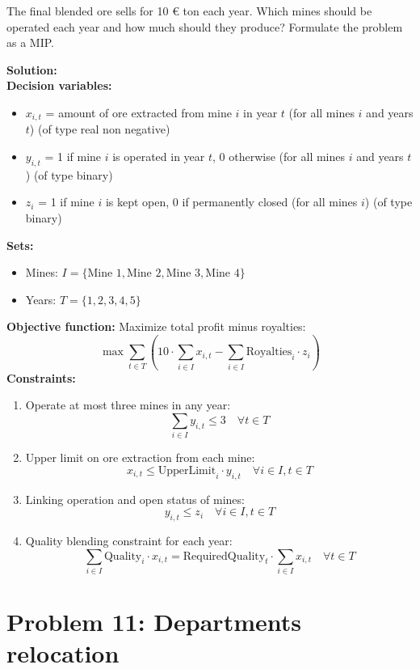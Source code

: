 \documentclass[a4paper,10pt]{article}
\begin{document}
The final blended ore sells for 10 $\euro$ ton each year. Which mines should be operated each year
and how much should they produce? Formulate the problem as a MIP.

\textbf{Solution:}\\

\textbf{Decision variables:}
\begin{itemize}
  \item \(x_{i,t}\) = amount of ore extracted from mine \(i\) in year \(t\) (for all mines \(i\) and years \(t\)) (of type real non negative)
  \item \(y_{i,t}\) = 1 if mine \(i\) is operated in year \(t\), 0 otherwise (for all mines \(i\) and years \(t\)) (of type binary)
  \item \(z_{i}\) = 1 if mine \(i\) is kept open, 0 if permanently closed (for all mines \(i\)) (of type binary)
\end{itemize}

\textbf{Sets:}
\begin{itemize}
  \item Mines: \(I = \{\text{Mine 1}, \text{Mine 2}, \text{Mine 3}, \text{Mine 4}\}\)
  \item Years: \(T = \{1, 2, 3, 4, 5\}\)
\end{itemize}
\textbf{Objective function:}
Maximize total profit minus royalties:
\[\max \sum_{t \in T} \left(10 \cdot \sum_{i \in I} x_{i,t} - \sum_{i \in I} \text{Royalties}_i \cdot z_i\right)\]  
\textbf{Constraints:}
\begin{enumerate}
  \item Operate at most three mines in any year:
  \[\boxed{\sum_{i \in I} y_{i,t} \leq 3 \quad \forall t \in T}\]

  \item Upper limit on ore extraction from each mine:
  \[\boxed{x_{i,t} \leq \text{UpperLimit}_i \cdot y_{i,t} \quad \forall i \in I, t \in T}\]

  \item Linking operation and open status of mines:
  \[\boxed{y_{i,t} \leq z_i \quad \forall i \in I, t \in T}\]

  \item Quality blending constraint for each year:
  \[\boxed{\sum_{i \in I} \text{Quality}_i \cdot x_{i,t} = \text{RequiredQuality}_t \cdot \sum_{i \in I} x_{i,t} \quad \forall t \in T}\]

\end{enumerate}

\newpage
\section*{Problem 11: Departments relocation}
\end{document}
